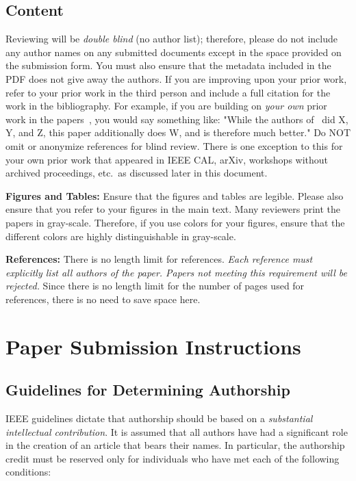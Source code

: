 \documentclass[conference]{IEEEtran}
\begin{document}
\subsection{Content}
Reviewing will be {\em double blind} (no author list); therefore,
please do not include any author names on any submitted documents
except in the space provided on the submission form.  You must also
ensure that the metadata included in the PDF does not give away the
authors. If you are improving upon your prior work, refer to your
prior work in the third person and include a full citation for the
work in the bibliography.  For example, if you are building on {\em
  your own} prior work in the
papers~\cite{nicepaper1,nicepaper2,nicepaper3}, you would say
something like: "While the authors of~\cite{nicepaper1,nicepaper2,nicepaper3} did X,
Y, and Z, this paper additionally does W, and is therefore much
better."  Do NOT omit or anonymize references for blind review.  There
is one exception to this for your own prior work that appeared in IEEE
CAL, arXiv, workshops without archived proceedings, etc.\ as
discussed later in this document.

\noindent\textbf{Figures and Tables:} Ensure that the figures and
tables are legible.  Please also ensure that you refer to your figures
in the main text.  Many reviewers print the papers in
gray-scale. Therefore, if you use colors for your figures, ensure that
the different colors are highly distinguishable in gray-scale.

\noindent\textbf{References:}  There is no length limit for
references. {\em Each reference must explicitly list all authors of
  the paper.  Papers not meeting this requirement will be rejected.}
Since there is no length limit for the number of pages
used for references, there is no need to save space here.


\section{Paper Submission Instructions}

\subsection{Guidelines for Determining Authorship}
IEEE guidelines dictate that authorship should be based on a {\em
  substantial intellectual contribution}. It is assumed that all
authors have had a significant role in the creation of an article that
bears their names. In particular, the authorship credit must be
reserved only for individuals who have met each of the following
conditions:
\end{document}
